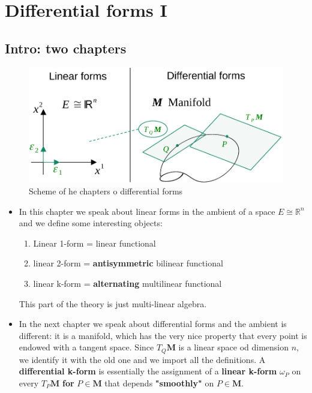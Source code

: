\documentclass[../main.tex]{subfiles}
\begin{document}
{}
\setchapterpreamble[u]{\margintoc}
\chapter[Differential forms I]{Differential forms I\footnotemark[0]}
\section*{Intro: two chapters}
\begin{figure}[H]
	\includegraphics{images/differential_forms_scheme.pdf}
	\caption[Scheme of he chapters o differential forms]{Scheme of he chapters o differential forms}
\end{figure}
\begin{itemize}
    \item In this chapter we speak about linear forms in the ambient of a space $E\cong \mathbb{R}^n$ and we define some interesting objects:
    \begin{enumerate}
        \item Linear 1-form = linear functional
        \item linear 2-form = \textbf{antisymmetric} bilinear functional
        \item linear k-form = \textbf{alternating} multilinear functional
    \end{enumerate}
    This part of the theory is just multi-linear algebra.
    \item In the next chapter we speak about differential forms and the ambient is different: it is a manifold, which has the very nice property that every point is endowed with a tangent space. Since $T_Q\mathbf{M}$ is a linear space od dimension $n$, we identify it with the old one and we import all the definitions. A \textbf{differential k-form} is essentially the assignment of a \textbf{linear k-form} $\omega_P$ on every $T_P\mathbf{M}$ \textbf{for} $P\in\mathbf{M}$ that depends \textbf{"smoothly"} on $P\in \mathbf{M}$.
\end{itemize}
\end{document}
